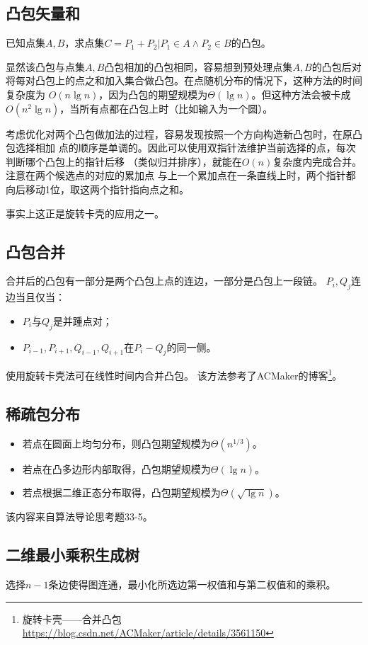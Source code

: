 \subsection{凸包矢量和}
已知点集$A,B$，求点集$C={P_1+P_2|P_1\in A \land P_2\in B}$的凸包。

显然该凸包与点集$A,B$凸包相加的凸包相同，容易想到预处理点集$A,B$的凸包后对
将每对凸包上的点之和加入集合做凸包。在点随机分布的情况下，这种方法的时间复杂度为
$O(n \lg n)$，因为凸包的期望规模为$\Theta(\lg n)$。但这种方法会被卡成
$O(n^2 \lg n)$，当所有点都在凸包上时（比如输入为一个圆）。

考虑优化对两个凸包做加法的过程，容易发现按照一个方向构造新凸包时，在原凸包选择相加
点的顺序是单调的。因此可以使用双指针法维护当前选择的点，每次判断哪个凸包上的指针后移
（类似归并排序），就能在$O(n)$复杂度内完成合并。注意在两个候选点的对应的累加点
与上一个累加点在一条直线上时，两个指针都向后移动1位，取这两个指针指向点之和。

事实上这正是旋转卡壳的应用之一。
\subsection{凸包合并}
合并后的凸包有一部分是两个凸包上点的连边，一部分是凸包上一段链。
$P_i,Q_j$连边当且仅当：
\begin{itemize}
	\item $P_i$与$Q_j$是并踵点对；
	\item $P_{i-1},P_{i+1},Q_{i-1},Q_{i+1}$在$P_i-Q_j$的同一侧。
\end{itemize}
使用旋转卡壳法可在线性时间内合并凸包。
该方法参考了ACMaker的博客\footnote{
	旋转卡壳——合并凸包
	\url{https://blog.csdn.net/ACMaker/article/details/3561150}
}。
\subsection{稀疏包分布}
\begin{itemize}
	\item 若点在圆面上均匀分布，则凸包期望规模为$\Theta(n^{1/3})$。
	\item 若点在凸多边形内部取得，凸包期望规模为$\Theta(\lg n)$。
	\item 若点根据二维正态分布取得，凸包期望规模为$\Theta(\sqrt{\lg n})$。
\end{itemize}
该内容来自算法导论\cite{ITA3}思考题33-5。
\subsection{二维最小乘积生成树}
选择$n-1$条边使得图连通，最小化所选边第一权值和与第二权值和的乘积。

